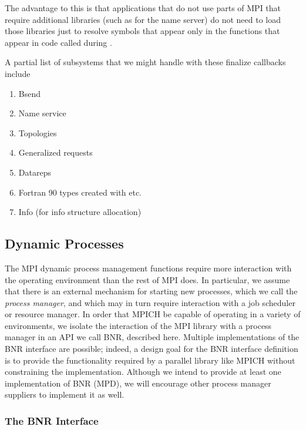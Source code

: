 \documentclass{article}
\begin{document}
The advantage to this is that applications that do not use parts of
MPI that require additional libraries (such as  for the
name server) do not need to load those libraries just to resolve
symbols that appear only in the functions that appear in code called
during .  


A partial list of subsystems that we might handle with these finalize
callbacks include 
\begin{enumerate}
\item Bsend 
\item Name service
\item Topologies
\item Generalized requests
\item Datareps
\item Fortran 90 types created with  etc.
\item Info (for info structure allocation)
\end{enumerate}

\subsection{Dynamic Processes}
\label{sec:spawn}

The MPI dynamic process management functions require more interaction with the
operating environment than the rest of MPI does.  In particular, we assume
that there is an external mechanism for starting new processes, which we call
the {\em process manager}, and which may in turn require interaction with a
job scheduler or resource manager.  In order that MPICH be capable of
operating in a variety of environments, we isolate the interaction of the MPI
library with a process manager in an API we call BNR, described here.
Multiple implementations of the BNR interface are possible;  indeed, a
design goal for the BNR interface definition is to provide the functionality
required by a parallel library like MPICH without constraining the
implementation.  Although we intend to provide at least one implementation of
BNR (MPD), we will encourage other process manager suppliers to implement it
as well.

\subsubsection{The BNR Interface}
\label{sec:bnr}
\end{document}
